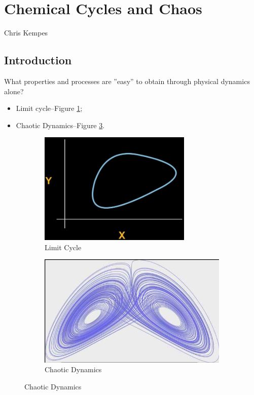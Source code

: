 \documentclass[]{article}
\begin{document}
{\cite[19.S, Nucleic Acids (Summary)]{brown2009chemistry}
\section{Chemical Cycles and Chaos}

Chris Kempes

\subsection{Introduction}

What properties and processes are ''easy'' to obtain through physical dynamics alone?
\begin{itemize}
	\item Limit cycle--Figure \ref{fig:LimitCycle};
	\item Chaotic Dynamics--Figure \ref{fig:ChaoticDynamics}.
\end{itemize}

\begin{figure}[H]
	\caption{Processes that are easy to obtain through physical dynamics alone}
	\begin{subfigure}[t]{0.45\textwidth}
		\caption{Limit Cycle}\label{fig:LimitCycle}
		\includegraphics[width=0.8\textwidth]{LimitCycle}
	\end{subfigure}
	\begin{subfigure}[t]{0.45\textwidth}
		\caption{Chaotic Dynamics}\label{fig:ChaoticDynamics}
		\includegraphics[width=\textwidth]{ChaoticDynamics}
	\end{subfigure}
\end{figure}

}
\end{document}
